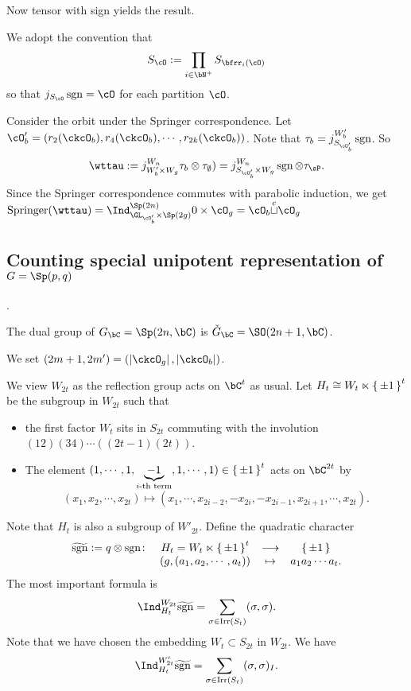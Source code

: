 \documentclass[12pt,a4paper]{amsart}
\def\abs#1{\left|{#1}\right|}
\newcommand{\sgn}{\operatorname{sgn}}
\numberwithin{equation}{section}
\theoremstyle{remark}
\def\Irr{\mathrm{Irr}}
\def\ckGc{\check{G}_{\bC}}
\def\Gc{G_\bC}
\def\cupcol{{\stackrel{c}{\sqcup}}}
\def\Spr{\mathrm{Springer}}
\def\hsgn{\widetilde{\mathrm{sgn}}}
\begin{document}
{  Now tensor with sign yields the result.

  We adopt the convention that
  \[
    S_{\cO} := \prod_{i\in \bN^{+}}S_{\bfrr_{i}(\cO)}
  \]
  so that $j_{S_{\cO}}\sgn = \cO$ for each partition $\cO$.

  Consider the orbit under the Springer correspondence. Let
  $\cO'_{b} = (r_{2}(\ckcO_{b}), r_{4}(\ckcO_{b}),\cdots, r_{2k}(\ckcO_{b}))$.
  Note that $\tau_{b} = j_{S_{\cO'_{b}}}^{W'_{b}} \sgn$. So
  \[
    \wttau:= j_{W'_{b}\times W_{g}}^{W_{n}} \tau_{b}\otimes \tau_{\emptyset}) = j_{S_{\cO'_{b}}\times W_{g}}^{W_{n}} \sgn\otimes \tau_{\sP}.
  \]
  Since the Springer correspondence commutes with parabolic induction, we get
  $\Spr(\wttau) = \Ind_{\GL_{\cO'_{b}}\times \Sp(2g)}^{\Sp(2n)} 0\times \cO_{g} = \cO_{b}\cupcol \cO_{g}$
}


\subsection{Counting special unipotent representation of $G=\Sp(p,q)$}.

The dual group of $\Gc = \Sp(2n,\bC)$ is $\ckGc = \SO(2n+1,\bC)$.

We set $(2m+1,2m') = (\abs{\ckcO_g},\abs{\ckcO_b})$.

We view $W_{2t}$ as the reflection group acts on $\bC^{t}$ as usual. Let
$H_{t}\cong W_t\ltimes \set{\pm 1}^t$ be the subgroup in $W_{2t}$ such that
\begin{itemize}
  \item the first factor $W_{t}$ sits in $S_{2t}$ commuting with the involution
        $(12)(34)\cdots ((2t-1)(2t))$.
  \item The element $(1,\cdots,1, \underbrace{-1}_{i\text{-th
        term}}, 1, \cdots, 1)\in \set{\pm 1}^{t}$ acts on $\bC^{2t}$ by
        \[
        (x_{1},x_{2},\cdots, x_{2t} ) \mapsto (x_{1},\cdots, x_{2i-2}, -x_{2i},-x_{2i-1},x_{2i+1},\cdots, x_{2t}).
        \]
\end{itemize}
Note that $H_{t}$ is also a subgroup of $W'_{2t}$.
Define the quadratic character
\[
  \begin{array}{rccc}
    \hsgn := q\otimes \sgn\colon & H_{t}=  W_{t}\ltimes \set{\pm 1}^{t}& \longrightarrow & \set{\pm 1}\\
    & (g,(a_{1},a_{2},\cdots, a_{t})) & \mapsto & a_{1}a_{2}\cdots a_{t}.
  \end{array}
\]
The most important formula is
\begin{equation}\label{eq:CC.C}
  \Ind_{H_{t}}^{W_{2t}} \hsgn = \sum_{\sigma\in \Irr(S_{t})} (\sigma,\sigma).
\end{equation}
Note that we have chosen the embedding $W_{t}\subset S_{2t}$ in $W_{2t}$. We have
\[
  \Ind_{H_{t}}^{W'_{2t}} \hsgn = \sum_{\sigma\in \Irr(S_{t})} (\sigma,\sigma)_{I}.
\]
\end{document}
